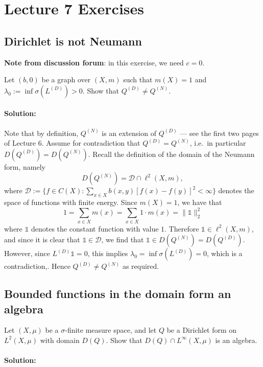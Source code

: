 \section{Lecture 7 Exercises}

\subsection{Dirichlet is not Neumann}

\textbf{Note from discussion forum}: in this exercise, we need $c=0$.

Let $(b, 0)$ be a graph over $(X,m)$ such that $m(X)=1$ and $\lambda_0 := \inf\sigma(L^{(D)})>0$. Show that $Q^{(D)}\ne Q^{(N)}$.

\paragraph{Solution:}
Note that by definition, $Q^{(N)}$ is an extension of $Q^{(D)}$ --- see the first two pages of Lecture 6. Assume for contradiction that $Q^{(D)}=Q^{(N)}$, i.e.\ in particular $D(Q^{(D)})=D(Q^{(N)})$. Recall the definition of the domain of the Neumann form, namely
\begin{equation*}
	D(Q^{(N)}) = \mathcal{D}\cap \ell^2(X,m),
\end{equation*}
where $\mathcal{D} := \{f\in C(X): \sum_{x\in X}b(x,y)[f(x)-f(y)]^2<\infty\}$ denotes the space of functions with finite energy. Since $m(X)=1$, we have that
\begin{equation*}
	1 = \sum_{x\in X}m(x) = \sum_{x\in X}1\cdot m(x) = \|\mathds{1}\|^2_2
\end{equation*}
where $\mathds{1}$ denotes the constant function with value $1$. Therefore $\mathds{1}\in \ell^2(X,m)$, and since it is clear that $\mathds{1}\in \mathcal{D}$, we find that $\mathds{1}\in D(Q^{(N)}) = D(Q^{(D)})$. However, since $L^{(D)}\mathds{1}=0$, this implies $\lambda_0 = \inf\sigma(L^{(D)})=0$, which is a contradiction,. Hence $Q^{(D)}\ne Q^{(N)}$ as required.

\subsection{Bounded functions in the domain form an algebra}
Let $(X,\mu)$ be a $\sigma$-finite measure space, and let $Q$ be a Dirichlet form on $L^2(X,\mu)$ with domain $D(Q)$. Show that $D(Q)\cap L^\infty(X,\mu)$ is an algebra.

\paragraph{Solution:}

